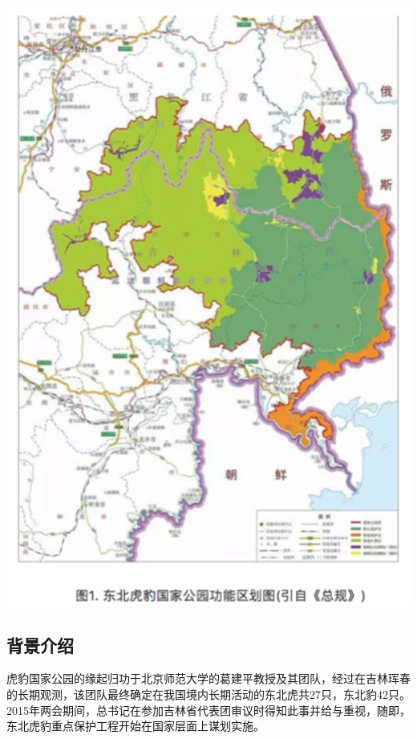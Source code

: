\documentclass[
]{book}
\begin{document}
\includegraphics[width=5.62in]{images/tiger1}

\hypertarget{ux80ccux666fux4ecbux7ecd}{%
\subsection{背景介绍}\label{ux80ccux666fux4ecbux7ecd}}

虎豹国家公园的缘起归功于北京师范大学的葛建平教授及其团队，经过在吉林珲春的长期观测，该团队最终确定在我国境内长期活动的东北虎共27只，东北豹42只。2015年两会期间，总书记在参加吉林省代表团审议时得知此事并给与重视，随即，东北虎豹重点保护工程开始在国家层面上谋划实施。
\end{document}
